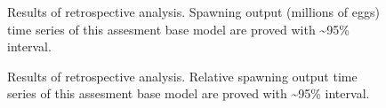 \documentclass[
]{scrartcl}
\begin{document}
\begin{figure}


\caption{\label{fig-retro-sp-output}Results of retrospective analysis.
Spawning output (millions of eggs) time series of this assesment base
model are proved with \textasciitilde95\% interval.}

\end{figure}%

\begin{figure}


\caption{\label{fig-retro-rel-biomass}Results of retrospective analysis.
Relative spawning output time series of this assesment base model are
proved with \textasciitilde95\% interval.}

\end{figure}%
\end{document}
